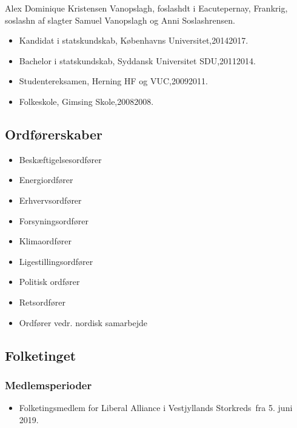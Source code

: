 \documentclass[11pt, a4paper]{awesome-cv}
\begin{document}
\makecvheader[R]
\makelettertitle
\begin{cvletter}
Alex Dominique Kristensen Vanopslagh, foslashdt i Eacutepernay, Frankrig, soslashn af slagter Samuel Vanopslagh og Anni Soslashrensen.

\begin{itemize}
\item Kandidat i statskundskab, Københavns Universitet,20142017.
\item Bachelor i statskundskab, Syddansk Universitet SDU,20112014.
\item Studentereksamen, Herning HF og VUC,20092011.
\item Folkeskole, Gimsing Skole,20082008.
\end{itemize}
\subsection*{Ordførerskaber}
\begin{itemize}
\item Beskæftigelsesordfører
\item Energiordfører
\item Erhvervsordfører
\item Forsyningsordfører
\item Klimaordfører
\item Ligestillingsordfører
\item Politisk ordfører
\item Retsordfører
\item Ordfører vedr. nordisk samarbejde
\end{itemize}
\subsection*{Folketinget}
\subsubsection*{Medlemsperioder}
\begin{itemize}
\item Folketingsmedlem for Liberal Alliance i Vestjyllands Storkreds fra 5. juni 2019.
\end{itemize}

\end{cvletter}
\end{document}
